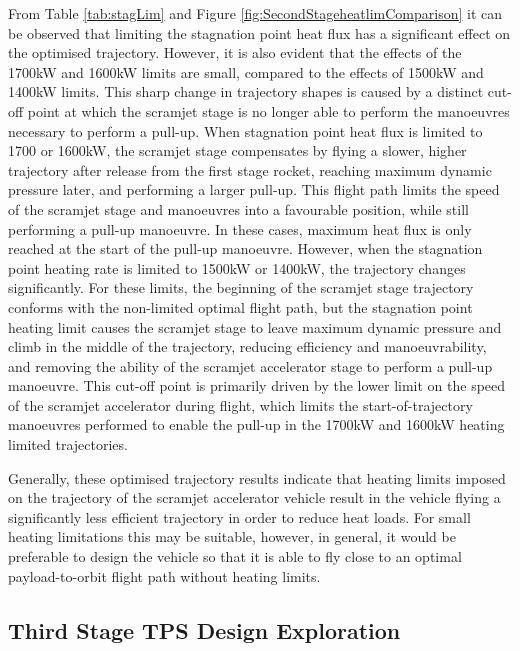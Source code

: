 From Table \ref{tab:stagLim} and Figure \ref{fig:SecondStageheatlimComparison} it can be observed that limiting the stagnation point heat flux has a significant effect on the optimised trajectory. However, it is also evident that the effects of the 1700kW and 1600kW limits are small, compared to the effects of 1500kW and 1400kW limits. 
This sharp change in trajectory shapes is caused by a distinct cut-off point at which the scramjet stage is no longer able to perform the manoeuvres necessary to perform a pull-up. When stagnation point heat flux is limited to 1700 or 1600kW, the scramjet stage compensates by flying a slower, higher trajectory after release from the first stage rocket, reaching maximum dynamic pressure later, and performing a larger pull-up. This flight path limits the speed of the scramjet stage and manoeuvres into a favourable position, while still performing a pull-up manoeuvre. In these cases, maximum heat flux is only reached at the start of the pull-up manoeuvre. However, when the stagnation point heating rate is limited to 1500kW or 1400kW, the trajectory changes significantly. For these limits, the beginning of the scramjet stage trajectory conforms with the non-limited optimal flight path, but the stagnation point heating limit causes the scramjet stage to leave maximum dynamic pressure and climb in the middle of the trajectory, reducing efficiency and manoeuvrability, and removing the ability of the scramjet accelerator stage to perform a pull-up manoeuvre. This cut-off point is primarily driven by the lower limit on the speed of the scramjet accelerator during flight, which limits the start-of-trajectory manoeuvres performed to enable the pull-up in the 1700kW and 1600kW heating limited trajectories. 

Generally, these optimised trajectory results indicate that heating limits imposed on the trajectory of the scramjet accelerator vehicle result in the vehicle flying a significantly less efficient trajectory in order to reduce heat loads. For small heating limitations this may be suitable, however, in general, it would be preferable to design the vehicle so that it is able to fly close to an optimal payload-to-orbit flight path without heating limits. 



\subsection{Third Stage TPS Design Exploration}\label{sec:thirdstageheat}

